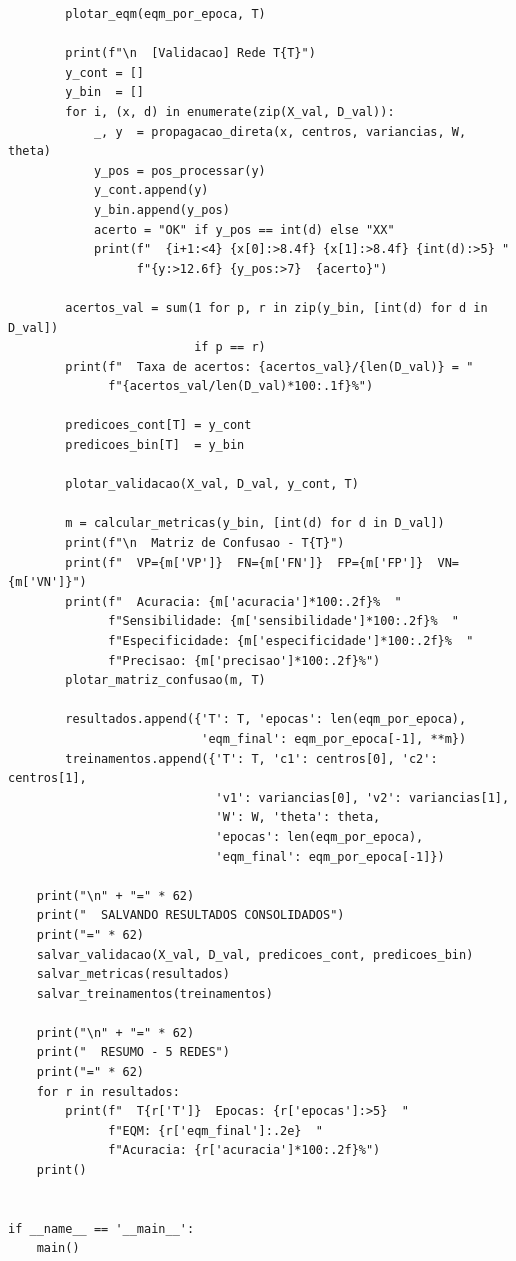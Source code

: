 \documentclass[article, 12pt, oneside, a4paper, section = TITLE, brazil]{abntex2}
\begin{document}
\begin{lstlisting}
        plotar_eqm(eqm_por_epoca, T)

        print(f"\n  [Validacao] Rede T{T}")
        y_cont = []
        y_bin  = []
        for i, (x, d) in enumerate(zip(X_val, D_val)):
            _, y  = propagacao_direta(x, centros, variancias, W, theta)
            y_pos = pos_processar(y)
            y_cont.append(y)
            y_bin.append(y_pos)
            acerto = "OK" if y_pos == int(d) else "XX"
            print(f"  {i+1:<4} {x[0]:>8.4f} {x[1]:>8.4f} {int(d):>5} "
                  f"{y:>12.6f} {y_pos:>7}  {acerto}")

        acertos_val = sum(1 for p, r in zip(y_bin, [int(d) for d in D_val])
                          if p == r)
        print(f"  Taxa de acertos: {acertos_val}/{len(D_val)} = "
              f"{acertos_val/len(D_val)*100:.1f}%")

        predicoes_cont[T] = y_cont
        predicoes_bin[T]  = y_bin

        plotar_validacao(X_val, D_val, y_cont, T)

        m = calcular_metricas(y_bin, [int(d) for d in D_val])
        print(f"\n  Matriz de Confusao - T{T}")
        print(f"  VP={m['VP']}  FN={m['FN']}  FP={m['FP']}  VN={m['VN']}")
        print(f"  Acuracia: {m['acuracia']*100:.2f}%  "
              f"Sensibilidade: {m['sensibilidade']*100:.2f}%  "
              f"Especificidade: {m['especificidade']*100:.2f}%  "
              f"Precisao: {m['precisao']*100:.2f}%")
        plotar_matriz_confusao(m, T)

        resultados.append({'T': T, 'epocas': len(eqm_por_epoca),
                           'eqm_final': eqm_por_epoca[-1], **m})
        treinamentos.append({'T': T, 'c1': centros[0], 'c2': centros[1],
                             'v1': variancias[0], 'v2': variancias[1],
                             'W': W, 'theta': theta,
                             'epocas': len(eqm_por_epoca),
                             'eqm_final': eqm_por_epoca[-1]})

    print("\n" + "=" * 62)
    print("  SALVANDO RESULTADOS CONSOLIDADOS")
    print("=" * 62)
    salvar_validacao(X_val, D_val, predicoes_cont, predicoes_bin)
    salvar_metricas(resultados)
    salvar_treinamentos(treinamentos)

    print("\n" + "=" * 62)
    print("  RESUMO - 5 REDES")
    print("=" * 62)
    for r in resultados:
        print(f"  T{r['T']}  Epocas: {r['epocas']:>5}  "
              f"EQM: {r['eqm_final']:.2e}  "
              f"Acuracia: {r['acuracia']*100:.2f}%")
    print()


if __name__ == '__main__':
    main()
\end{lstlisting}
\end{document}
